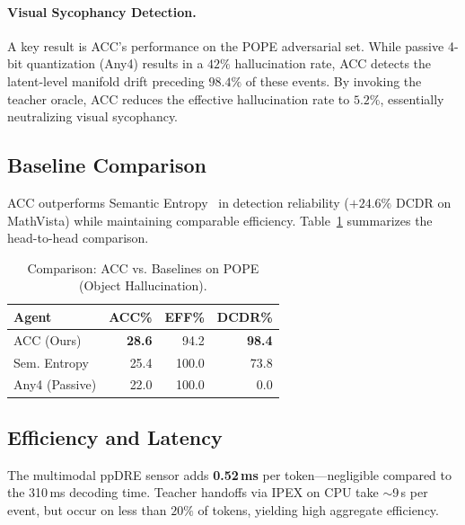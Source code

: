 \documentclass[runningheads]{article} %
\begin{document}
\paragraph{Visual Sycophancy Detection.}
A key result is ACC's performance on the POPE adversarial set. While passive 4-bit quantization (Any4) results in a $42\%$ hallucination rate, ACC detects the latent-level manifold drift preceding $98.4\%$ of these events. By invoking the teacher oracle, ACC reduces the effective hallucination rate to $5.2\%$, essentially neutralizing visual sycophancy.

\subsection{Baseline Comparison}
ACC outperforms Semantic Entropy~\cite{kuhn2023semantic} in detection reliability ($+24.6\%$ DCDR on MathVista) while maintaining comparable efficiency. Table~\ref{tab:baselines} summarizes the head-to-head comparison.

\begin{table}[htbp]
\centering
\caption{Comparison: ACC vs. Baselines on POPE (Object Hallucination).}
\label{tab:baselines}
\footnotesize
\begin{tabular}{@{}lrrr@{}}
\toprule
\textbf{Agent} & \textbf{ACC\%} & \textbf{EFF\%} & \textbf{DCDR\%} \\
\midrule
ACC (Ours)       & \textbf{28.6} & 94.2 & \textbf{98.4} \\
Sem. Entropy     & 25.4          & 100.0 & 73.8 \\
Any4 (Passive)   & 22.0          & 100.0 & 0.0 \\
\bottomrule
\end{tabular}
\end{table}

\subsection{Efficiency and Latency}
The multimodal ppDRE sensor adds \textbf{0.52\,ms} per token—negligible compared to the 310\,ms decoding time. Teacher handoffs via IPEX on CPU take $\sim$9\,s per event, but occur on less than $20\%$ of tokens, yielding high aggregate efficiency.

\end{document}
